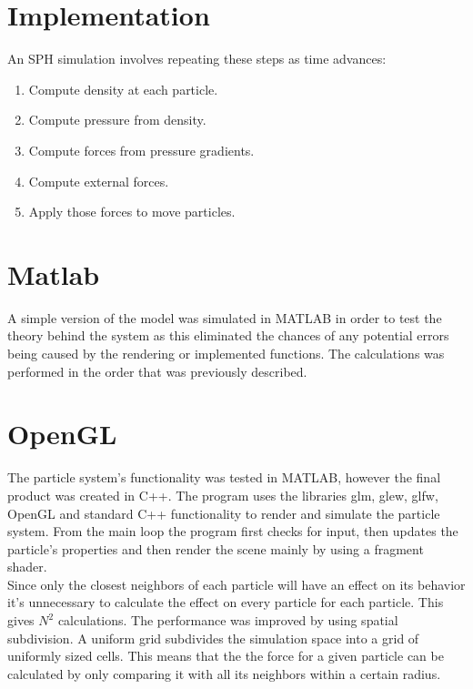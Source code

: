 \documentclass[a4paper,12pt,twoside]{report}
\begin{document}
\section{Implementation}
An SPH simulation involves repeating these steps as time advances:
\begin{enumerate}
\item Compute density at each particle.
\item Compute pressure from density.
\item Compute forces from pressure gradients.
\item Compute external forces.
\item Apply those forces to move particles.
\end{enumerate}

\section{Matlab}
A simple version of the model was simulated in MATLAB in order to test the theory behind the system as this eliminated the chances of any potential errors being caused by the rendering or implemented functions. The calculations was performed in the order that was previously described.

\section{OpenGL}
The particle system’s functionality was tested in MATLAB, however the final product was created in C++. The program uses the libraries glm, glew, glfw, OpenGL and standard C++ functionality to render and simulate the particle system. From the main loop the program first checks for input, then updates the particle’s properties and then render the scene mainly by using a fragment shader. \\

\noindent Since only the closest neighbors of each particle will have an effect on its behavior it’s unnecessary to calculate the effect on every particle for each particle. This gives \(N^2\) calculations. The performance was improved by using spatial subdivision. A uniform grid subdivides the simulation space into a grid of uniformly sized cells. This means that the the force for a given particle can be calculated by only comparing it with all its neighbors within a certain radius. \\
\end{document}
